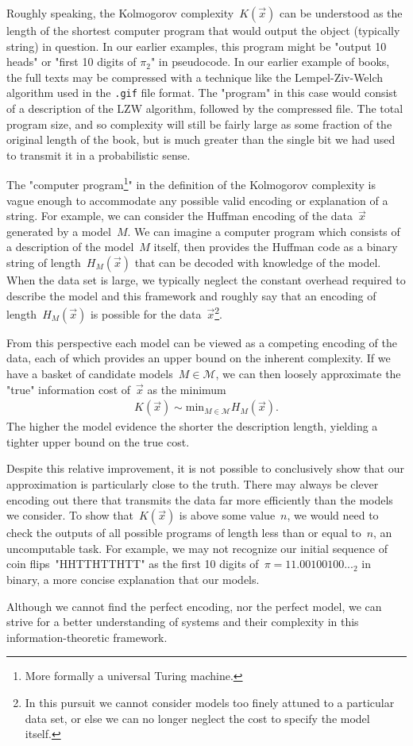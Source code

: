 Roughly speaking, the Kolmogorov complexity~$K(\vec{x})$ can be understood as the length of the shortest computer program that would output the object (typically string) in question. In our earlier examples, this program might be "output 10 heads" or "first 10 digits of $\pi_2$" in pseudocode. In our earlier example of books, the full texts may be compressed with a technique like the Lempel-Ziv-Welch algorithm used in the \verb|.gif| file format. The "program" in this case would consist of a description of the LZW algorithm, followed by the compressed file. The total program size, and so complexity will still be fairly large as some fraction of the original length of the book, but is much greater than the single bit we had used to transmit it in a probabilistic sense. 

The "computer program\footnote{More formally a universal Turing machine.}" in the definition of the Kolmogorov complexity is vague enough to accommodate any possible valid encoding or explanation of a string. For example, we can consider the Huffman encoding of the data~$\vec{x}$ generated by a model~$M$. We can imagine a computer program which consists of a description of the model~$M$ itself, then provides the Huffman code as a binary string of length~$H_M(\vec{x})$ that can be decoded with knowledge of the model. When the data set is large, we typically neglect the constant overhead required to describe the model and this framework and roughly say that an encoding of length~$H_M(\vec{x})$ is possible for the data~$\vec{x}$\footnote{In this pursuit we cannot consider models too finely attuned to a particular data set, or else we can no longer neglect the cost to specify the model itself.}.

From this perspective each model can be viewed as a competing encoding of the data, each of which provides an upper bound on the inherent complexity. If we have a basket of candidate models~$M \in \mathcal{M}$, we can then loosely approximate the "true" information cost of~$\vec{x}$ as the minimum \begin{align}
    K(\vec{x}) \sim \text{min}_{M \in \mathcal{M}} H_{M}(\vec{x}).
\end{align}
The higher the model evidence the shorter the description length, yielding a tighter upper bound on the true cost. 

Despite this relative improvement, it is not possible to conclusively show that our approximation is particularly close to the truth. There may always be clever encoding out there that transmits the data far more efficiently than the models we consider. To show that~$K(\vec{x})$ is above some value~$n$, we would need to check the outputs of all possible programs of length less than or equal to~$n$, an uncomputable task. For example, we may not recognize our initial sequence of coin flips~"HHTTHTTHTT" as the first 10 digits of~$\pi = 11.00100100..._2$ in binary, a more concise explanation that our models. 

Although we cannot find the perfect encoding, nor the perfect model, we can strive for a better understanding of systems and their complexity in this information-theoretic framework.